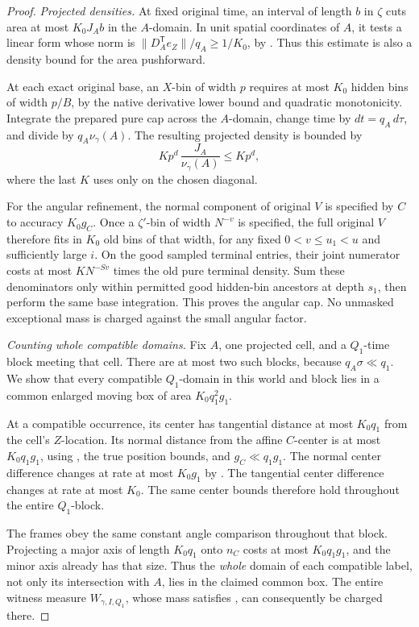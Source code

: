 \begin{proof}
\emph{Projected densities.}
At fixed original time, an interval of length \(b\) in \(\zeta\)
cuts area at most \(K_0J_Ab\) in the \(A\)-domain.  In unit spatial
coordinates of \(A\), it tests a linear form whose norm is
\(\|D_A^{\mathsf T}e_Z\|/q_A\ge1/K_0\), by
.  Thus this estimate is also a density
bound for the area pushforward.

At each exact original base, an \(X\)-bin of width \(p\) requires at
most \(K_0\) hidden bins of width \(p/B\), by the native derivative
lower bound and quadratic monotonicity.  Integrate the prepared pure
cap across the \(A\)-domain, change time by \(dt=q_A\,d\tau\), and
divide by \(q_A\nu_\gamma(A)\).  The resulting projected density is
bounded by
\[
 Kp^d\,\frac{J_A}{\nu_\gamma(A)}\le Kp^d,
\]
where the last \(K\) uses  only on the
chosen diagonal.

For the angular refinement, the normal component of original \(V\)
is specified by \(C\) to accuracy \(K_0g_C\).  Once a \(\zeta'\)-bin
of width \(N^{-v}\) is specified, the full original \(V\) therefore
fits in \(K_0\) old bins of that width, for any fixed
\(0<v\le u_1<u\) and sufficiently large \(i\).
On the good sampled terminal entries, their joint numerator costs
at most \(KN^{-Sv}\) times the old pure terminal density.
Sum these denominators only within permitted good hidden-bin
ancestors at depth \(s_1\), then perform the same base integration.
This proves the angular cap.  No unmasked exceptional mass is
charged against the small angular factor.

\emph{Counting whole compatible domains.}
Fix \(A\), one projected cell, and a \(Q_1\)-time block meeting that
cell.  There are at most two such blocks, because \(q_A\sigma\ll q_1\).
We show that every compatible \(Q_1\)-domain in this world and block
lies in a common enlarged moving box of area \(K_0q_1^2g_1\).

At a compatible occurrence, its center has tangential distance at
most \(K_0q_1\) from the cell's \(Z\)-location.  Its normal distance
from the affine \(C\)-center is at most \(K_0q_1g_1\), using
, the true position bounds, and
\(g_C\ll q_1g_1\).  The normal center difference changes at rate at
most \(K_0g_1\) by .  The tangential center
difference changes at rate at most \(K_0\).  The same center bounds
therefore hold throughout the entire \(Q_1\)-block.

The frames obey the same constant angle comparison throughout
that block.  Projecting a major axis of length \(K_0q_1\) onto
\(n_C\) costs at most \(K_0q_1g_1\), and the minor axis already has
that size.  Thus the \emph{whole} domain of each compatible label,
not only its intersection with \(A\), lies in the claimed common
box.  The entire witness measure \(W_{\gamma,I,Q_1}\), whose mass
satisfies , can consequently be charged
there.


\end{proof}
